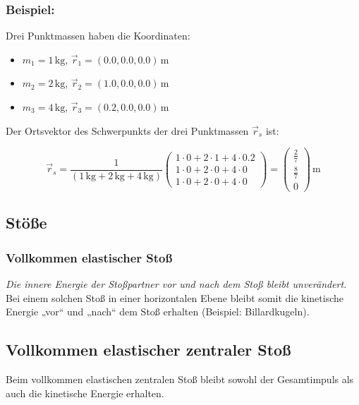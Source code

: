 \documentclass[a4paper, 8pt]{extarticle}
\begin{document}
\begin{landscape}
\begin{multicols*}{3}
\subsubsection{Beispiel:} Drei Punktmassen haben die Koordinaten:
\begin{itemize}
    \item \( m_1 = 1 \, \text{kg} \), \( \vec{r}_1 = (0.0, 0.0, 0.0) \, \text{m} \)
    \item \( m_2 = 2 \, \text{kg} \), \( \vec{r}_2 = (1.0, 0.0, 0.0) \, \text{m} \)
    \item \( m_3 = 4 \, \text{kg} \), \( \vec{r}_3 = (0.2, 0.0, 0.0) \, \text{m} \)
\end{itemize}

Der Ortsvektor des Schwerpunkts der drei Punktmassen \( \vec{r}_s \) ist:

\[
\vec{r}_s = \frac{1}{(1 \, \text{kg} + 2 \, \text{kg} + 4 \, \text{kg})} \begin{pmatrix} 1 \cdot 0 + 2 \cdot 1 + 4 \cdot 0.2 \\ 1 \cdot 0 + 2 \cdot 0 + 4 \cdot 0 \\ 1 \cdot 0 + 2 \cdot 0 + 4 \cdot 0 \end{pmatrix} = \begin{pmatrix} \frac{2}{7} \\ \frac{8}{7} \\ 0 \end{pmatrix} \, \text{m}
\]
\subsection{Stöße}

\subsubsection{Vollkommen elastischer Stoß}

\textit{Die innere Energie der Stoßpartner vor und nach dem Stoß bleibt unverändert}. Bei einem solchen Stoß in einer horizontalen Ebene bleibt somit die kinetische Energie „vor“ und „nach“ dem Stoß erhalten (Beispiel: Billardkugeln).


\subsection{Vollkommen elastischer zentraler Stoß}

Beim vollkommen elastischen zentralen Stoß bleibt sowohl der Gesamtimpuls als auch die kinetische Energie erhalten.


\end{multicols*}
\end{landscape}
\end{document}
